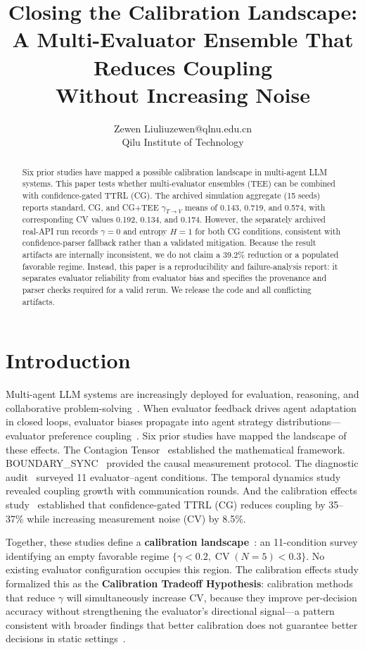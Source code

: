 \documentclass[11pt]{article}
\title{Closing the Calibration Landscape: \\ A Multi-Evaluator Ensemble That Reduces Coupling \\ Without Increasing Noise}
\author{\name Zewen Liu\email liuzewen@qlnu.edu.cn\\\addr Qilu Institute of Technology}  %
\date{}
\DeclareMathOperator{\CV}{CV}
\begin{document}
\maketitle

\begin{abstract}
Six prior studies have mapped a possible calibration landscape in multi-agent LLM systems. This paper tests whether multi-evaluator ensembles (TEE) can be combined with confidence-gated TTRL (CG). The archived simulation aggregate (15 seeds) reports standard, CG, and CG+TEE $\gamma_{T\to V}$ means of 0.143, 0.719, and 0.574, with corresponding CV values 0.192, 0.134, and 0.174. However, the separately archived real-API run records $\gamma=0$ and entropy $H=1$ for both CG conditions, consistent with confidence-parser fallback rather than a validated mitigation. Because the result artifacts are internally inconsistent, we do not claim a 39.2\% reduction or a populated favorable regime. Instead, this paper is a reproducibility and failure-analysis report: it separates evaluator reliability from evaluator bias and specifies the provenance and parser checks required for a valid rerun. We release the code and all conflicting artifacts.
\end{abstract}

\newpage

\section{Introduction}

Multi-agent LLM systems are increasingly deployed for evaluation, reasoning, and collaborative problem-solving~\cite{zheng2023judging,chiang2024chatbot,li2023camel,wu2024autogen,snell2024scaling}. When evaluator feedback drives agent adaptation in closed loops, evaluator biases propagate into agent strategy distributions---evaluator preference coupling~\cite{liu2026epc}. Six prior studies have mapped the landscape of these effects. The Contagion Tensor~\cite{liu2026tensor} established the mathematical framework. BOUNDARY\_SYNC~\cite{liu2026boundarysync} provided the causal measurement protocol. The diagnostic audit~\cite{liu2026audit} surveyed 11 evaluator--agent conditions. The temporal dynamics study~\cite{liu2026temporal} revealed coupling growth with communication rounds. And the calibration effects study~\cite{liu2026caleffects} established that confidence-gated TTRL (CG) reduces coupling by 35--37\% while increasing measurement noise (CV) by 8.5\%.

Together, these studies define a \textbf{calibration landscape}~\cite{liu2026caleffects}: an 11-condition survey identifying an empty favorable regime $\{\gamma < 0.2, \CV(N{=}5) < 0.3\}$. No existing evaluator configuration occupies this region. The calibration effects study formalized this as the \textbf{Calibration Tradeoff Hypothesis}: calibration methods that reduce $\gamma$ will simultaneously increase CV, because they improve per-decision accuracy without strengthening the evaluator's directional signal---a pattern consistent with broader findings that better calibration does not guarantee better decisions in static settings~\cite{guo2017calibration,he2026paradox}.
\end{document}
